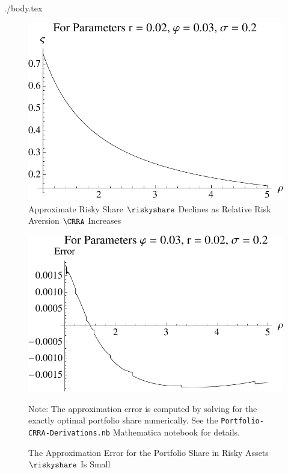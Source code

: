 \documentclass{\handout}
\begin{document}
\begin{verbatimwrite}{./body.tex}
\pagebreak\vfill\eject
\begin{figure}[h]
  \centering
  \caption{Approximate Risky Share $\riskyshare$ Declines as Relative Risk Aversion $\CRRA$ Increases}
    \label{fig:Port:a}
    \includegraphics[width=6in]{./Figures/ShareVsCRRA}
  \end{figure}
  \begin{figure}
    \centering
    \caption{The Approximation Error for the Portfolio Share in Risky Assets $\riskyshare$ Is Small}
    \label{fig:Port:b}
    \includegraphics[width=6in]{./Figures/ShareApproxErr}
\begin{flushleft} \footnotesize Note: The approximation error is computed by solving for the exactly optimal
  portfolio share numerically.  See the \texttt{Portfolio-CRRA-Derivations.nb} Mathematica notebook for details.
  \end{flushleft}
\end{figure}


\end{verbatimwrite}
\end{document}
